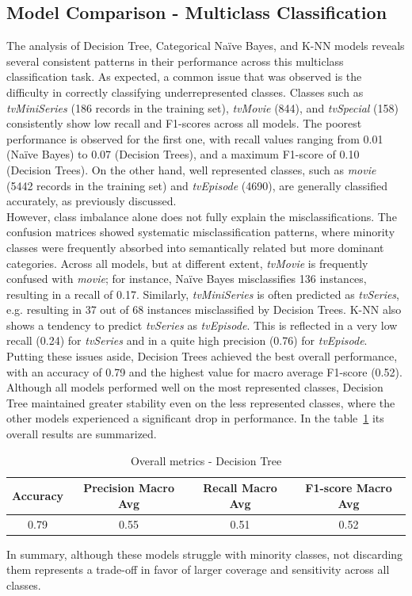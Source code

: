 \subsection{Model Comparison - Multiclass Classification}
The analysis of Decision Tree, Categorical Naïve Bayes, and K-NN models reveals several consistent patterns in their performance across this multiclass classification task. 
As expected, a common issue that was observed is the difficulty in correctly classifying underrepresented classes.
Classes such as \textit{tvMiniSeries} (186 records in the training set), \textit{tvMovie} (844), and \textit{tvSpecial} (158) consistently show low recall and F1-scores across all models.
The poorest performance is observed for the first one, with recall values ranging from 0.01 (Naïve Bayes) to 0.07 (Decision Trees), and a maximum F1-score of 0.10 (Decision Trees).
On the other hand, well represented classes, such as \textit{movie} (5442 records in the training set) and \textit{tvEpisode} (4690), are generally classified accurately, as previously discussed.\\
However, class imbalance alone does not fully explain the misclassifications. 
The confusion matrices showed systematic misclassification patterns, 
where minority classes were frequently absorbed into semantically related but more dominant categories. 
Across all models, but at different extent, \textit{tvMovie} is frequently confused with \textit{movie}; for instance, Naïve Bayes misclassifies 136 instances, resulting in a recall of 0.17.
Similarly, \textit{tvMiniSeries} is often predicted as \textit{tvSeries}, e.g. resulting in 37 out of 68 instances misclassified by Decision Trees.
K-NN also shows a tendency to predict \textit{tvSeries} as \textit{tvEpisode}.
This is reflected in a very low recall (0.24) for \textit{tvSeries} and in a quite high precision (0.76) for \textit{tvEpisode}.\\
Putting these issues aside, Decision Trees achieved the best overall performance, with an accuracy of 0.79 and 
the highest value for macro average F1-score (0.52). 
Although all models performed well on the most represented classes, Decision Tree maintained greater stability even on the less represented classes,
where the other models experienced a significant drop in performance.
In the table~\ref{tab:best_model_multiclass_classification} its overall results are summarized.
\begin{table}[H]
    \centering
    \begin{tabular}{cccc}
        \toprule
        \bf{Accuracy} & \bf{Precision Macro Avg} & \bf{Recall Macro Avg} & \bf{F1-score Macro Avg} \\
        \midrule
         0.79 & 0.55 & 0.51 & 0.52 \\
        \bottomrule
    \end{tabular}
    \caption{Overall metrics - Decision Tree}
    \label{tab:best_model_multiclass_classification}
\end{table}
In summary, although these models struggle with minority classes, not discarding them represents a trade-off in favor of larger coverage and sensitivity across all classes.


 






